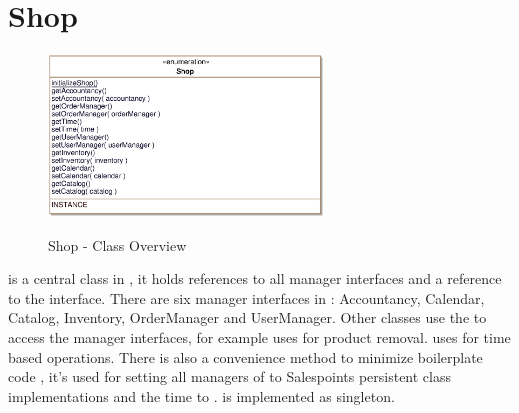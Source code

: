\section{Shop}
\label{shop}

\begin{figure}[ht]
	\centering
  \includegraphics[width=0.65\textwidth]{images/Shop_Overview.eps}
	\label{shop_overview}
	\caption{Shop - Class Overview}
\end{figure}

 is a central class in \salespoint{}, it holds references to all manager interfaces and a reference to the  interface.
There are six manager interfaces in \salespoint{}: Accountancy, Calendar, Catalog, Inventory, OrderManager and UserManager.
Other classes use the  to access the manager interfaces, for example  uses  for product removal.
 uses  for time based operations.
There is also a convenience method to minimize boilerplate code , it's used for setting all managers of  to Salespoints persistent class implementations and the time to .
 is implemented as singleton.